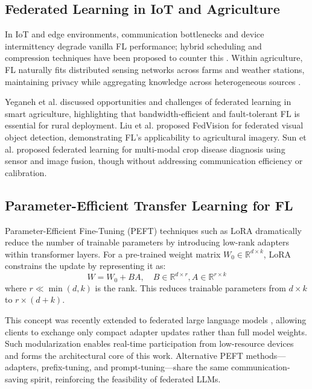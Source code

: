 \documentclass[10pt,journal,compsoc]{IEEEtran}
\begin{document}
\subsection{Federated Learning in IoT and Agriculture}

In IoT and edge environments, communication bottlenecks and device intermittency degrade vanilla FL performance; hybrid scheduling and compression techniques have been proposed to counter this \cite{xu2021communication}. Within agriculture, FL naturally fits distributed sensing networks across farms and weather stations, maintaining privacy while aggregating knowledge across heterogeneous sources \cite{durrant2022role}.

Yeganeh et al. \cite{yeganeh2023federated} discussed opportunities and challenges of federated learning in smart agriculture, highlighting that bandwidth-efficient and fault-tolerant FL is essential for rural deployment. Liu et al. \cite{liu2020fedvision} proposed FedVision for federated visual object detection, demonstrating FL's applicability to agricultural imagery. Sun et al. \cite{sun2023federated} proposed federated learning for multi-modal crop disease diagnosis using sensor and image fusion, though without addressing communication efficiency or calibration.

\subsection{Parameter-Efficient Transfer Learning for FL}

Parameter-Efficient Fine-Tuning (PEFT) techniques such as LoRA \cite{hu2022lora} dramatically reduce the number of trainable parameters by introducing low-rank adapters within transformer layers. For a pre-trained weight matrix $W_0 \in \mathbb{R}^{d \times k}$, LoRA constrains the update by representing it as:
\begin{equation}
W = W_0 + BA, \quad B \in \mathbb{R}^{d \times r}, A \in \mathbb{R}^{r \times k}
\end{equation}
where $r \ll \min(d, k)$ is the rank. This reduces trainable parameters from $d \times k$ to $r \times (d + k)$.

This concept was recently extended to federated large language models \cite{yu2023parameter}, allowing clients to exchange only compact adapter updates rather than full model weights. Such modularization enables real-time participation from low-resource devices and forms the architectural core of this work. Alternative PEFT methods---adapters, prefix-tuning, and prompt-tuning---share the same communication-saving spirit, reinforcing the feasibility of federated LLMs.
\end{document}
